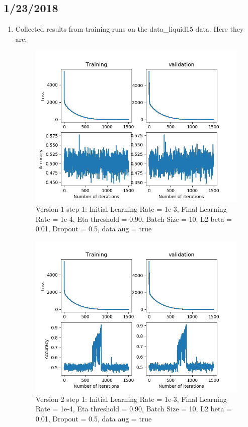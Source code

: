 \documentclass[12pt,reqno]{amsart}
\numberwithin{equation}{section}
\begin{document}
\subsection{1/23/2018}
\begin{enumerate}
\item Collected results from training runs on the data\_liquid15 data.  Here they are:

\begin{figure}[H]
\centering
\includegraphics[scale=0.6]{data_liquid15_version1_step1}
\caption{Version 1 step 1: Initial Learning Rate = 1e-3, Final Learning Rate = 1e-4, Eta threshold = 0.90, Batch Size = 10, L2 beta = 0.01, Dropout = 0.5, data aug = true}
\end{figure}

\begin{figure}[H]
\centering
\includegraphics[scale=0.6]{data_liquid15_version2_step1}
\caption{Version 2 step 1: Initial Learning Rate = 1e-3, Final Learning Rate = 1e-4, Eta threshold = 0.90, Batch Size = 10, L2 beta = 0.01, Dropout = 0.5, data aug = true}
\end{figure}


\end{enumerate}
\end{document}
